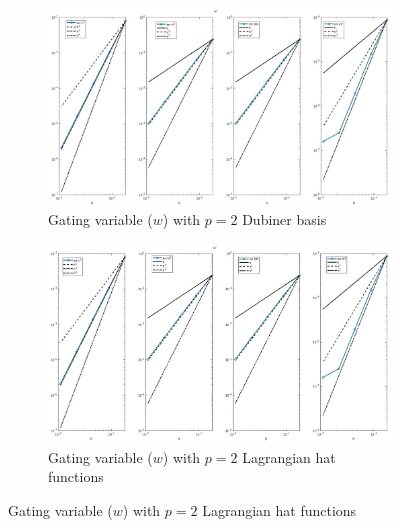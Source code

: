 \documentclass[a4paper,11pt]{article}
\begin{document}
\begin{figure}[H]
\caption{Comparison of the gating variable ($w$)}
\label{w_2}
\begin{subfigure}{\textwidth}
\begin{center}
\includegraphics[width = \textwidth]{./D2_w_1.jpg}
\caption{Gating variable ($w$) with $p=2$ Dubiner basis}
\end{center}
\end{subfigure}
\begin{subfigure}{\textwidth}
\begin{center}
\includegraphics[width =\textwidth]{./P2_w_1.jpg}
\caption{Gating variable ($w$) with $p=2$ Lagrangian hat functions}
\end{center}
\end{subfigure}
\end{figure}
\end{document}
